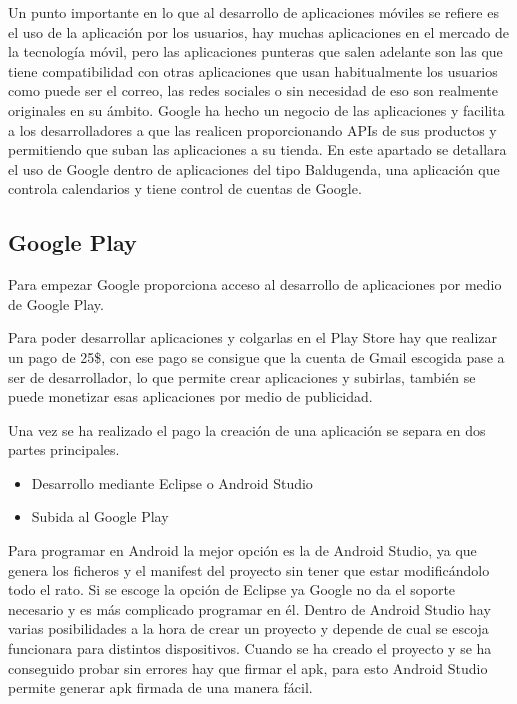 Un punto importante en lo que al desarrollo de aplicaciones móviles se refiere es el uso de la aplicación por los usuarios, hay muchas aplicaciones en el mercado de la tecnología móvil, pero las aplicaciones punteras que salen adelante son las que tiene compatibilidad con otras aplicaciones que usan habitualmente los usuarios como puede ser el correo, las redes sociales o sin necesidad de eso son realmente originales en su ámbito.
Google ha hecho un negocio de las aplicaciones  y facilita a los desarrolladores a que las realicen proporcionando APIs de sus productos y permitiendo que suban las aplicaciones a su tienda.
En este apartado se detallara el uso de Google dentro de aplicaciones del tipo Baldugenda, una aplicación que controla calendarios y tiene control de cuentas de Google.

\subsection{Google Play}
\label{subsecc:Google Play}

Para empezar Google proporciona acceso al desarrollo de aplicaciones por medio de Google Play.

Para poder desarrollar aplicaciones y colgarlas en el Play Store hay que realizar un pago de 25\$, con ese pago se consigue que la cuenta de Gmail escogida pase a ser de desarrollador, lo que permite crear aplicaciones y subirlas, también se puede monetizar esas aplicaciones por medio de publicidad.

Una vez se ha realizado el pago la creación de una aplicación se separa en dos partes principales.

\begin{itemize}
\item Desarrollo mediante Eclipse o Android Studio
\item Subida al Google Play
\end{itemize}

Para programar en Android la mejor opción es la de Android Studio, ya que genera los ficheros y el manifest del proyecto sin tener que estar modificándolo todo el rato.
Si se escoge la opción de Eclipse ya Google no da el soporte necesario y es más complicado programar en él.
Dentro de Android Studio hay varias posibilidades a la hora de crear un proyecto y depende de cual se escoja funcionara para distintos dispositivos.
Cuando se ha creado el proyecto y se ha conseguido probar sin errores hay que firmar el apk, para esto Android Studio permite generar apk firmada de una manera fácil.

